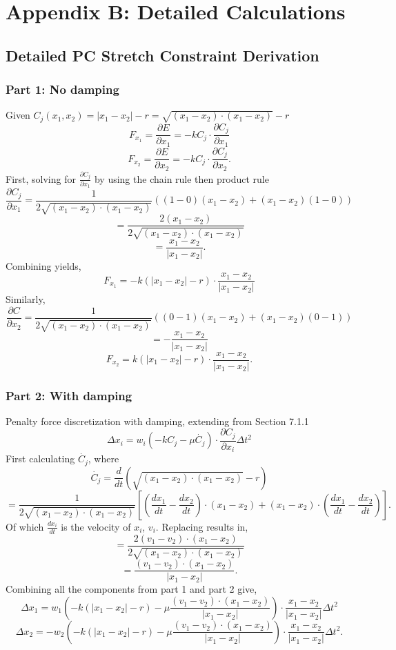\documentclass[12pt, letterpaper]{article}
\begin{document}
\clearpage

\section{Appendix B: Detailed Calculations}
\subsection{Detailed PC Stretch Constraint Derivation}
\subsubsection{Part 1: No damping}

Given $C_j(x_{1},x_{2}) = |x_{1}-x_{2}|-r= \sqrt{(x_{1}-x_{2}) \cdot (x_{1}-x_{2})} - r$
$$F_{x_{1}}=\frac{\partial E}{\partial x_{1}}=-kC_j\cdot \frac{\partial C_j}{\partial x_{1}}$$
$$F_{x_{2}}=\frac{\partial E}{\partial x_{2}}=-kC_j\cdot \frac{\partial C_j}{\partial x_{2}}.$$
First, solving for $\frac{\partial C_j}{\partial x_{1}}$ by using the chain rule then product rule
$$\frac{\partial C_j}{\partial x_{1}} = \frac{1}{2 \sqrt{(x_{1}-x_{2}) \cdot (x_{1}-x_{2})}} ((1-0)(x_{1}-x_{2}) + (x_{1}-x_{2})(1-0))$$
$$= \frac{2(x_{1}-x_{2})}{2 \sqrt{(x_{1}-x_{2}) \cdot (x_{1}-x_{2})}}$$
$$=\frac{x_{1}-x_{2}}{|x_{1}-x_{2}|}.$$
Combining yields,
$$F_{x_{1}} = -k( |x_{1}-x_{2}|-r) \cdot \frac{x_{1}-x_{2}}{|x_{1}-x_{2}|}$$
Similarly,
$$\frac{\partial C}{\partial x_{2}} = \frac{1}{2 \sqrt{(x_{1}-x_{2}) \cdot (x_{1}-x_{2})}} ((0 -1)(x_{1}-x_{2}) + (x_{1}-x_{2})(0 - 1))$$ $$ =- \frac{x_{1}-x_{2}}{|x_{1}-x_{2}|}$$
$$F_{x_{2}} = k( |x_{1}-x_{2}|-r) \cdot \frac{x_{1}-x_{2}}{|x_{1}-x_{2}|}.$$
\subsubsection{Part 2: With damping}
Penalty force discretization with damping, extending from Section 7.1.1
$$\Delta x_{i} = w_{i}(-kC_j - \mu \dot{C_j}) \cdot \frac{\partial C_j}{\partial x_{i}} \Delta t^{2}$$
First calculating $\dot{C_j}$, where
$$\dot{C_j} = \frac{d}{dt}(\sqrt{(x_{1}-x_{2}) \cdot (x_{1}-x_{2})} - r)$$
$$= \frac{1}{2 \sqrt{(x_{1}-x_{2}) \cdot (x_{1}-x_{2})}} \left[ \left( \frac{dx_{1}}{dt} - \frac{dx_{2}}{dt} \right)\cdot (x_{1} - x_{2}) + (x_{1} - x_{2})\cdot \left(\frac{dx_{1}}{dt} - \frac{dx_{2}}{dt}\right) \right] .$$
Of which $\frac{dx_{i}}{dt}$ is the velocity of $x_{i}$, $v_{i}$. Replacing results in, 
$$= \frac{2 (v_{1} - v_{2})\cdot (x_{1} - x_{2})}{2 \sqrt{(x_{1}-x_{2}) \cdot (x_{1}-x_{2})}}$$
$$= \frac{(v_{1} - v_{2}) \cdot (x_{1} - x_{2})}{|x_{1}-x_{2}|}.$$
Combining all the components from part 1 and part 2 give, 
$$\Delta x_{1} = w_{1}\left(-k(|x_{1}-x_{2}|-r) - \mu \frac{(v_{1} - v_{2}) \cdot (x_{1} - x_{2})}{|x_{1}-x_{2}|}\right) \cdot \frac{x_{1}-x_{2}}{|x_{1}-x_{2}|} \Delta t^{2}$$
$$\Delta x_{2} = -w_{2}\left(-k(|x_{1}-x_{2}|-r) - \mu \frac{(v_{1} - v_{2}) \cdot (x_{1} - x_{2})}{|x_{1}-x_{2}|}\right) \cdot \frac{x_{1}-x_{2}}{|x_{1}-x_{2}|} \Delta t^{2}.$$
\end{document}
